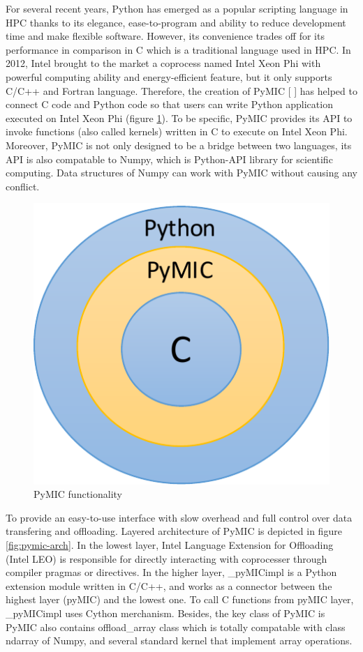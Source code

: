For several recent years, Python has emerged as a popular scripting language in HPC thanks to its elegance, ease-to-program and ability to reduce development time and make flexible software. However, its convenience trades off for its performance in comparison in C which is a traditional language used in HPC. In 2012, Intel brought to the market a coprocess named Intel Xeon Phi with powerful computing ability and energy-efficient feature, but it only supports C/C++ and Fortran language. Therefore, the creation of PyMIC [ ] has helped to connect C code and Python code so that users can write Python application executed on Intel Xeon Phi (figure \ref{fig:pymic-feat}). To be specific,  PyMIC provides its API to invoke functions (also called kernels) written in C to execute on Intel Xeon Phi. Moreover, PyMIC is not only designed to be a bridge between two languages, its API is also compatable to Numpy, which is Python-API library for scientific computing. Data structures of Numpy can work with PyMIC without causing any conflict.

\begin{figure}[h]
\centering
\includegraphics[scale=0.5]{img/pymic-feat.pdf}
\caption{PyMIC functionality}
\label{fig:pymic-feat}
\end{figure}

To provide an easy-to-use interface with slow overhead and full control over data transfering and offloading. Layered architecture of PyMIC is depicted in figure \ref{fig:pymic-arch}. In the lowest layer, Intel Language Extension for Offloading (Intel LEO) is responsible for directly interacting with coprocesser through compiler pragmas or directives. In the higher layer, \_pyMICimpl is a Python extension module written in C/C++, and works as a connector between the highest layer (pyMIC) and the lowest one. To call C functions from pyMIC layer, \_pyMICimpl uses Cython merchanism. Besides, the key class of PyMIC is PyMIC also contains offload\_array class which is totally compatable with class ndarray of Numpy, and several standard kernel that implement array operations.		


